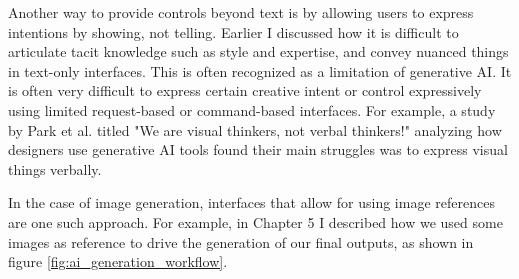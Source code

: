 Another way to provide controls beyond text is by allowing users to express intentions by showing, not telling. Earlier I discussed how it is difficult to articulate tacit knowledge such as style and expertise, and convey nuanced things in text-only interfaces. This is often recognized as a limitation of generative AI. It is often very difficult to express certain creative intent or control expressively using limited request-based or command-based interfaces. For example, a study by Park et al. \cite{Park2024-gw} titled "We are visual thinkers, not verbal thinkers!" analyzing how designers use generative AI tools found their main struggles was to express visual things verbally.

In the case of image generation, interfaces that allow for using image references are one such approach. For example, in Chapter 5 I described how we used some images as reference to drive the generation of our final outputs, as shown in figure \ref{fig:ai_generation_workflow}.

